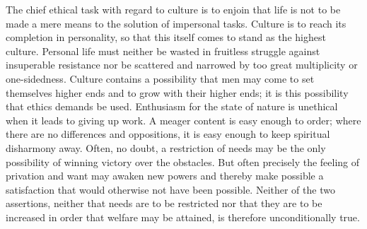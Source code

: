 \documentclass[12pt,a4paper,openany]{book}
\newcommand{\opage}[1]{\marginnote{\footnotesize\textit{[#1]}}}
\begin{document}
The chief ethical task with regard to culture is to enjoin that life is not to be made a mere means to the
solution of impersonal tasks. Culture is to reach its completion in personality, so that this itself comes
to stand as the highest culture. Personal life must neither be wasted in fruitless struggle against
insuperable resistance nor be scattered and narrowed by too great multiplicity or one-sidedness. Culture
contains a possibility that men may come to set themselves higher ends and to grow with their higher ends;
it is this possibility that ethics demands be used. Enthusiasm for the state of nature is unethical when it
leads to giving up work. A meager content is easy enough to order; where there are no differences and
oppositions, it is easy enough
\opage{149}to keep spiritual disharmony away. Often, no doubt, a restriction of needs may be the only possibility
of winning victory over the obstacles. But often precisely the feeling of privation and want may awaken
new powers and thereby make possible a satisfaction that would otherwise not have been possible. Neither of
the two assertions, neither that needs are to be restricted nor that they are to be increased in order that
welfare may be attained, is therefore unconditionally true.
\end{document}

